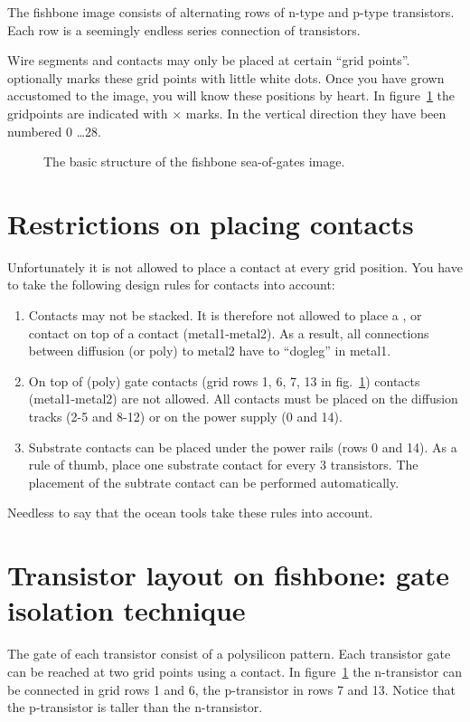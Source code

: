 The fishbone image consists of alternating rows of n-type and p-type
transistors. Each row is a seemingly endless series connection of transistors.

Wire segments and contacts may only be placed at certain ``grid points''.
 optionally marks these grid points with little white dots. Once
you have grown accustomed to the image, you will know these positions by heart.
In figure~\ref{f-fishbone} the gridpoints are indicated with $\times$ marks.
In the vertical direction they have been numbered 0 \ldots 28.

\begin{figure}
\centerline{}
\caption{The basic structure of the fishbone sea-of-gates image.}
\label{f-fishbone}
\end{figure}

\section{Restrictions on placing contacts}
\label{contacts}
Unfortunately it is not allowed to place a contact at every grid
position. You have to take the following design rules for contacts
into account:
\begin{enumerate}
\item
{}
Contacts may not be stacked. It is therefore not allowed to place a ,
 or  contact on top of a  contact
(metal1-metal2).  As a result, all connections between diffusion (or poly) to
metal2 have to ``dogleg'' in metal1.
\item
On top of (poly) gate contacts (grid rows 1, 6, 7, 13 in 
fig.~\ref{f-fishbone}) 
contacts (metal1-metal2) are not allowed. 
All  contacts must be placed
on the diffusion tracks (2-5 and 8-12) or on the power supply (0 and 14).
\item
Substrate contacts can be placed under the power
rails (rows 0 and 14). As a rule of thumb, place one substrate contact for
every 3 transistors. The placement of the subtrate contact can be performed
automatically. 
\end{enumerate}
Needless to say that the {\sc ocean} tools take these rules into account.

\section{Transistor layout on fishbone: gate isolation technique}
The gate of each transistor consist of a polysilicon pattern. Each transistor
gate can be reached at two grid points using a  contact. In
figure~\ref{f-fishbone} the n-transistor can be connected in grid rows 1 and 6,
the p-transistor in rows 7 and 13. Notice that the p-transistor is taller than
the n-transistor.

